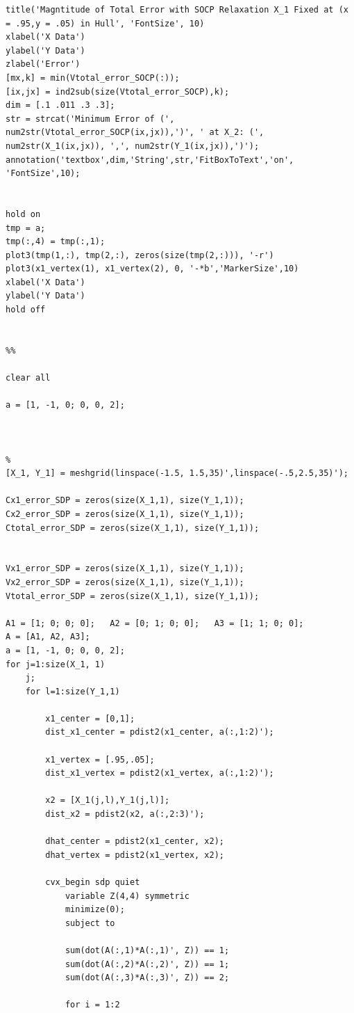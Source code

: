 \documentclass{article} %
\begin{document}
\begin{itemize}
\begin{lstlisting}
title('Magntitude of Total Error with SOCP Relaxation X_1 Fixed at (x = .95,y = .05) in Hull', 'FontSize', 10)
xlabel('X Data')
ylabel('Y Data')
zlabel('Error')
[mx,k] = min(Vtotal_error_SOCP(:));
[ix,jx] = ind2sub(size(Vtotal_error_SOCP),k);
dim = [.1 .011 .3 .3];
str = strcat('Minimum Error of (', num2str(Vtotal_error_SOCP(ix,jx)),')', ' at X_2: (', num2str(X_1(ix,jx)), ',', num2str(Y_1(ix,jx)),')');
annotation('textbox',dim,'String',str,'FitBoxToText','on', 'FontSize',10);


hold on
tmp = a;
tmp(:,4) = tmp(:,1);
plot3(tmp(1,:), tmp(2,:), zeros(size(tmp(2,:))), '-r')
plot3(x1_vertex(1), x1_vertex(2), 0, '-*b','MarkerSize',10)
xlabel('X Data')
ylabel('Y Data')
hold off


%%

clear all

a = [1, -1, 0; 0, 0, 2];



%
[X_1, Y_1] = meshgrid(linspace(-1.5, 1.5,35)',linspace(-.5,2.5,35)');

Cx1_error_SDP = zeros(size(X_1,1), size(Y_1,1));
Cx2_error_SDP = zeros(size(X_1,1), size(Y_1,1));
Ctotal_error_SDP = zeros(size(X_1,1), size(Y_1,1));


Vx1_error_SDP = zeros(size(X_1,1), size(Y_1,1));
Vx2_error_SDP = zeros(size(X_1,1), size(Y_1,1));
Vtotal_error_SDP = zeros(size(X_1,1), size(Y_1,1));

A1 = [1; 0; 0; 0];   A2 = [0; 1; 0; 0];   A3 = [1; 1; 0; 0];
A = [A1, A2, A3];
a = [1, -1, 0; 0, 0, 2];
for j=1:size(X_1, 1)
    j;
    for l=1:size(Y_1,1)
        
        x1_center = [0,1];
        dist_x1_center = pdist2(x1_center, a(:,1:2)');
        
        x1_vertex = [.95,.05];
        dist_x1_vertex = pdist2(x1_vertex, a(:,1:2)');
        
        x2 = [X_1(j,l),Y_1(j,l)];
        dist_x2 = pdist2(x2, a(:,2:3)');
        
        dhat_center = pdist2(x1_center, x2);
        dhat_vertex = pdist2(x1_vertex, x2);
        
        cvx_begin sdp quiet
            variable Z(4,4) symmetric
            minimize(0);
            subject to

            sum(dot(A(:,1)*A(:,1)', Z)) == 1;
            sum(dot(A(:,2)*A(:,2)', Z)) == 1;
            sum(dot(A(:,3)*A(:,3)', Z)) == 2;
            
            for i = 1:2
                

\end{lstlisting}
\end{itemize}
\end{document}
